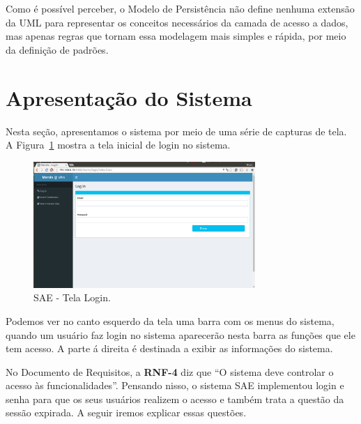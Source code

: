 Como é possível perceber, o Modelo de Persistência não define nenhuma extensão da UML para representar os conceitos necessários da camada de acesso a dados, mas apenas regras que tornam essa modelagem mais simples e rápida, por meio da definição de padrões.
















\section{Apresentação do Sistema}
\label{sec-projeto-apresentacao-sistema}

Nesta seção, apresentamos o sistema por meio de uma série de capturas de tela. A Figura~\ref{fig-projeto-apresentacao-login} mostra a tela inicial de login no sistema. 


\begin{figure}[h]
	\centering
	\includegraphics[width=0.75\textwidth]{figuras/projeto/fig-projeto-apresentacao-login}
	\caption{SAE - Tela Login.}
	\label{fig-projeto-apresentacao-login}
\end{figure}

Podemos ver no canto esquerdo da tela uma barra com os menus do sistema, quando um usuário faz login no sistema aparecerão nesta barra as funções que ele tem acesso. A parte á direita é destinada a exibir as informações do sistema.



No Documento de Requisitos, a \textbf{RNF-4} diz que ``O sistema deve controlar o acesso às funcionalidades''. Pensando nisso, o sistema SAE implementou login e senha para que os seus usuários realizem o acesso e também trata a questão da sessão expirada. A seguir iremos explicar essas questões.


